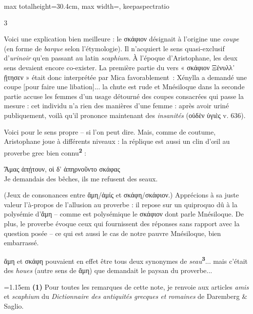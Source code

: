 \documentclass[11pt,twoside]{book}
\newcommand{\italique}[1]{\textit{#1}}
\newcommand{\citComm}[1]{\begin{quoting}[vskip=0.4pt,leftmargin=0.7em,rightmargin=0.2em]#1\end{quoting}}
\newcommand{\grec}[1]{{\policeGr #1}}
\newcommand{\latin}[1]{\textit{#1}}
\newcommand{\marqueur}[1]{\textsuperscript{\color{rubricRed}\textbf{#1}}}
\begin{document}
\begin{adjustbox}{max totalheight=30.4cm, max width=\textwidth, keepaspectratio}
\begin{minipage}{\textwidth}
{\begin{multicols}{3}
\par\vspace{1.5pt}
\noindent Voici une explication bien meilleure : le \grec{σκάφιον} désignait à l'origine une \italique{coupe} (en forme de \italique{barque} selon l'étymologie). Il n'acquiert le sens quasi-exclusif d'\italique{urinoir} qu'en passant au latin \latin{scaphium}. À l'époque d'Aristophane, les deux sens devaient encore co-exister. La première partie du vers « σκάφιον Ξένυλλ᾽ ᾔτησεν » était donc interprétée par Mica favorablement~: Xénylla a demandé une coupe $[$pour faire une libation$]$... la chute est rude et Mnésiloque dans la seconde partie accuse les femmes d'un usage détourné des coupes consacrées qui passe la mesure : cet individu n'a rien des manières d'une femme : après avoir uriné publiquement, voilà qu'il prononce maintenant des \italique{insanités} (οὐδὲν ὑγιὲς v. 636).\\
\par\vspace{1.5pt}
\noindent Voici pour le sens propre -- si l'on peut dire. Mais, comme de coutume, Aristophane joue à différents niveaux : la réplique est aussi un clin d'œil au proverbe grec bien connu\marqueur{2} :
\citComm{Ἄμας ἀπῄτουν, οἱ δ' ἀπηρνοῦντο σκάφας\\
Je demandais des bêches, ils me refusent des seaux.}
\par\vspace{1.5pt}
\noindent (Jeux de consonances entre ἄμη/ἀμίς et σκάφη/σκάφιον.) Apprécions à sa juste valeur l'à-propos de l'allusion au proverbe : il repose sur un quiproquo dû à la polysémie d'ἄμη -- comme est polysémique le σκάφιον dont parle Mnésiloque. De plus, le proverbe évoque ceux qui fournissent des réponses sans rapport avec la question posée -- ce qui est aussi le cas de notre pauvre Mnésiloque, bien embarrassé.
\par\vspace{1.5pt}
\noindent ἄμη et σκάφη pouvaient en effet être tous deux synonymes de \italique{seau}\marqueur{3}... mais c'était des \italique{houes} (autre sens de ἄμη) que demandait le paysan du proverbe...
\par\vspace{1.5pt}
\par\vspace{1.2pt}\par\nopagebreak\vspace{1pt}\noindent\hangindent=1.15em {\color{sepiaNote}\textbf{(1)}} Pour toutes les remarques de cette note, je renvoie aux articles \latin{amis} et \latin{scaphium} du \italique{Dictionnaire des antiquités grecques et romaines} de Daremberg \& Saglio.

\end{multicols}}
\end{minipage}
\end{adjustbox}
\end{document}

